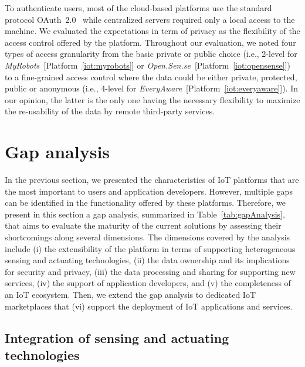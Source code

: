 \documentclass[preprint,10pt,5p]{elsarticle}
\newcommand{\citeiot}[1]{[Platform~\ref{#1}]}
\begin{document}
To authenticate users, most of the cloud-based platforms use the standard 
protocol OAuth~2.0~\cite{rfc6749} while
centralized servers required only a local access to the machine.
We evaluated the expectations in term of privacy as the flexibility of
the access control offered by the platform. 
Throughout our evaluation, we noted four types of access granularity
from the  basic private or public choice (i.e., 2-level for
\emph{MyRobots}~\citeiot{iot:myrobots} or
\emph{Open.Sen.se}~\citeiot{iot:opensense}) to a fine-grained access
control where the data could be either private, protected, public or
anonymous (i.e., 4-level for
\emph{EveryAware}~\citeiot{iot:everyaware}). 
In our opinion, the latter is the only one having the necessary
flexibility to maximize the re-usability of the data by remote
third-party services.

\section{Gap analysis}\label{sec:gap}

In the previous section, we presented the characteristics of IoT
platforms that are the most important to users and application
developers.
However, multiple gaps can be identified in the functionality offered
by these platforms.
Therefore, we present in this section a gap analysis, summarized in Table~\ref{tab:gapAnalysis},
that aims to
evaluate the maturity of the current solutions by assessing their
shortcomings along several dimensions. 
The dimensions covered by the analysis include (i) the extensibility of the
platform in terms of supporting heterogeneous sensing and actuating
technologies, (ii) the data ownership and its implications for
security and privacy, (iii) the data processing and sharing for
supporting new services, (iv) the support of application developers, 
and (v) the completeness of an IoT ecosystem. 
Then, we extend the gap analysis to dedicated IoT marketplaces that
(vi) support the deployment of IoT applications and services.

\subsection{Integration of sensing and actuating technologies}
\label{sec:gap_devices}
\end{document}
